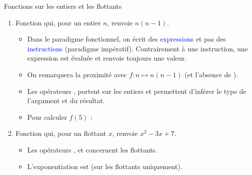 \documentclass[10pt]{beamer}
\begin{document}
\begin{frame}{\Ctitle}{\stitle}
	\begin{exampleblock}{Fonctions sur les entiers et les flottants}
		\begin{enumerate}
			\item<1-> Fonction qui, pour un entier $n$, renvoie $n(n-1)$.
				\begin{itemize}
					\item<2->{\textcolor{BrickRed}{\danger} Dans le paradigme fonctionnel, on écrit des \textcolor{blue}{expressions} et pas des \textcolor{blue}{instructions} (paradigme impératif). Contrairement à une instruction, une expression est évaluée et renvoie toujours une valeur.}
					\item<3->{ On remarquera la proximité avec  $f : n \mapsto n(n-1)$ (et l'absence de  ).}
					\item<4->{ Les opérateurs \kw{*}, \kw{-} portent sur les entiers et permettent d'inférer le type de l'argument et du résultat.}
					\item<5->{ Pour calculer $f(5)$ : }
				\end{itemize}
			\item<6-> Fonction qui, pour un flottant $x$, renvoie $x^2-3x+7$.
				\begin{itemize}
					\item<7-> Les opérateurs ,  et  concernent les flottants.
					\item<8-> L'exponentiation est \kw{**} (sur les flottants uniquement).
				\end{itemize}
		\end{enumerate}
	\end{exampleblock}
\end{frame}
\end{document}
